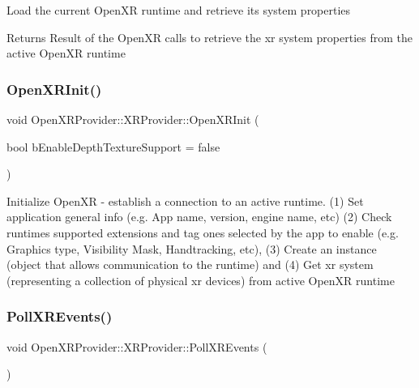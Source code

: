 Load the current Open\+XR runtime and retrieve its system properties \begin{DoxyReturn}{Returns}
Result of the Open\+XR calls to retrieve the xr system properties from the active Open\+XR runtime 
\end{DoxyReturn}
\mbox{\label{class_open_x_r_provider_1_1_x_r_provider_a0d19487d4508a89e3554a9fa328b4a05}} 
\subsubsection{\texorpdfstring{OpenXRInit()}{OpenXRInit()}}
{\footnotesize\ttfamily void Open\+X\+R\+Provider\+::\+X\+R\+Provider\+::\+Open\+X\+R\+Init (\begin{DoxyParamCaption}\item[{bool}]{b\+Enable\+Depth\+Texture\+Support = {\ttfamily false} }\end{DoxyParamCaption})\hspace{0.3cm}{\ttfamily [private]}}

Initialize Open\+XR -\/ establish a connection to an active runtime. (1) Set application general info (e.\+g. App name, version, engine name, etc) (2) Check runtime\textquotesingle{}s supported extensions and tag ones selected by the app to enable (e.\+g. Graphics type, Visibility Mask, Handtracking, etc), (3) Create an instance (object that allows communication to the runtime) and (4) Get xr system (representing a collection of physical xr devices) from active Open\+XR runtime \mbox{\label{class_open_x_r_provider_1_1_x_r_provider_a1eb2fce148d5ab2d3399235c23131808}} 
\subsubsection{\texorpdfstring{PollXREvents()}{PollXREvents()}}
{\footnotesize\ttfamily void Open\+X\+R\+Provider\+::\+X\+R\+Provider\+::\+Poll\+X\+R\+Events (\begin{DoxyParamCaption}{ }\end{DoxyParamCaption})}



